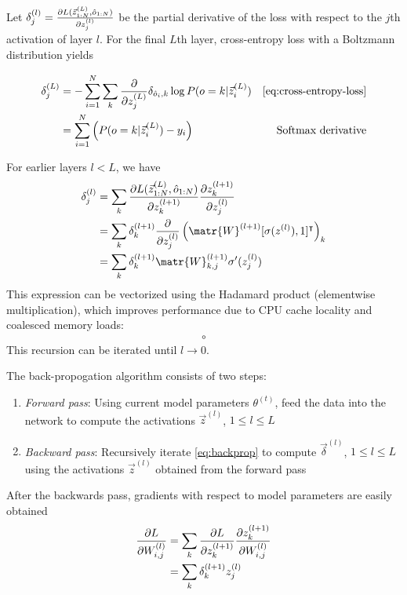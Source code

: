 \documentclass[dissertation.tex]{subfile}
\begin{document}
Let $\delta^{(l)}_{j} = \frac{\partial L(\vec{z}^{(L)}_{1:N}, \hat{o}_{1:N})}{\partial
z^{(l)}_j}$ be the partial derivative of the loss with respect to the $j$th
activation of layer $l$. For the final $L$th layer, cross-entropy loss
with a Boltzmann distribution yields

\begin{align*}
    \delta^{(L)}_{j}
    &= - \sum_{i=1}^{N} \sum_{k} \frac{\pd}{\pd z^{(L)}_j} \delta_{\hat{o}_i,k} \log P(o=k | \vec{z}^{(L)}_i ) &\mbox{\autoref{eq:cross-entropy-loss}} \\
    &= \sum_{i=1}^{N} \left( P(o=k | \vec{z}^{(L)}_i ) - y_i \right) & \mbox{Softmax derivative}
\end{align*}

For earlier layers $l < L$, we have
\begin{align}
    \delta^{(l)}_{j}
    &= \sum_k \frac{\pd L(\vec{z}^{(L)}_{1:N}, \hat{o}_{1:N})}{\pd z^{(l+1)}_k}
    \frac{\pd z^{(l+1)}_k}{\pd z^{(l)}_j}\\
    &= \sum_k \delta^{(l+1)}_k
    \frac{\pd}{\pd z^{(l)}_j} \left( \matr{W}^{(l+1)} [\sigma(z^{(l)}), 1]^\tp \right)_k \\
    &= \sum_k \delta^{(l+1)}_k
    \matr{W}^{(l+1)}_{k,j} \sigma'(z^{(l)}_j) \label{eq:backprop}
\end{align}
This expression can be vectorized using the Hadamard product (elementwise multiplication), which
improves performance due to CPU cache locality and coalesced memory loads: 
\begin{align}
    \circ
\end{align}
This recursion can be iterated until $l \to 0$.

The back-propogation algorithm consists of two steps:
\begin{enumerate}
    \item \emph{Forward pass}: Using current model parameters $\theta^{(t)}$,
        feed the data into the network to compute the activations $\vec{z}^{(l)}$,
        $1 \leq l \leq L$
    \item \emph{Backward pass}: Recursively iterate \autoref{eq:backprop}
        to compute $\vec{\delta}^{(l)}$, $1 \leq l \leq L$ using the activations
        $\vec{z}^{(l)}$ obtained from the forward pass
\end{enumerate}

After the backwards pass, gradients with respect to model parameters are easily obtained
\begin{align}
    \frac{\partial L}{\partial W^{(l)}_{i,j} }
    &= \sum_k \frac{\partial L}{\partial z^{(l+1)}_k} \frac{\partial z^{(l+1)}_k}{\partial W^{(l)}_{i,j}} \\
    &= \sum_k \delta^{(l+1)}_k z^{(l)}_j
\end{align}
\end{document}
